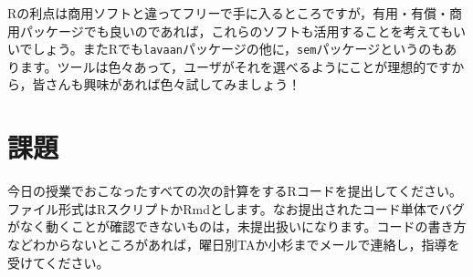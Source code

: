 \documentclass{ltjsbook}
\begin{document}
Rの利点は商用ソフトと違ってフリーで手に入るところですが，有用・有償・商用パッケージでも良いのであれば，これらのソフトも活用することを考えてもいいでしょう。またRでも\texttt{lavaan}パッケージの他に，\texttt{sem}パッケージというのもあります。ツールは色々あって，ユーザがそれを選べるようにことが理想的ですから，皆さんも興味があれば色々試してみましょう！

\section{課題}
今日の授業でおこなったすべての次の計算をするRコードを提出してください。ファイル形式はRスクリプトかRmdとします。なお提出されたコード単体でバグがなく動くことが確認できないものは，未提出扱いになります。コードの書き方などわからないところがあれば，曜日別TAか小杉までメールで連絡し，指導を受けてください。
\end{document}
